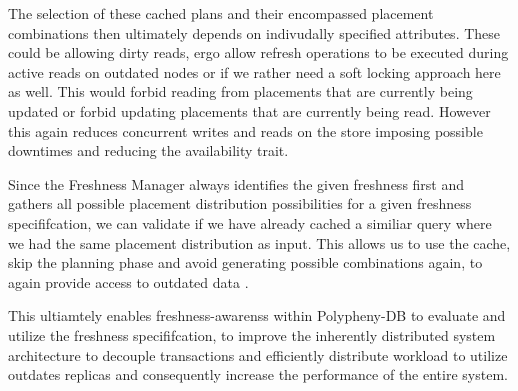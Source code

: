 The selection of these cached plans and their encompassed placement combinations then ultimately depends on indivudally specified attributes.
These could be allowing dirty reads, ergo allow refresh operations to be executed during active reads on outdated nodes or if we rather need a soft 
locking approach here as well. This would forbid reading from placements that are currently being updated or forbid updating placements that are currently being read.
However this again reduces concurrent writes and reads on the store imposing possible downtimes and reducing the availability trait.

Since the Freshness Manager always identifies the given freshness first and gathers all possible placement distribution possibilities for a given freshness specififcation, 
we can validate if we have already cached a similiar query where we had the same placement distribution as input. 
This allows us to use the cache, skip the planning phase and avoid generating possible combinations again, to again provide access to outdated data . 

This ultiamtely enables freshness-awarenss within Polypheny-DB to evaluate and utilize the freshness specififcation, to improve the inherently distributed system 
architecture to decouple transactions and efficiently distribute workload to utilize outdates replicas and consequently increase the performance of the entire system.







